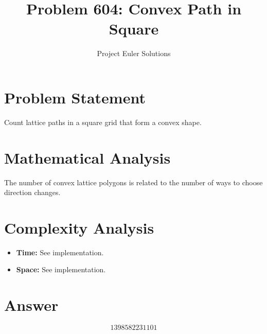 \documentclass[11pt]{article}
\title{Problem 604: Convex Path in Square}
\author{Project Euler Solutions}
\date{}
\begin{document}
\maketitle

\section{Problem Statement}
Count lattice paths in a square grid that form a convex shape.

\section{Mathematical Analysis}
The number of convex lattice polygons is related to the number of ways to choose direction changes.

\section{Complexity Analysis}
\begin{itemize}
    \item \textbf{Time:} See implementation.
    \item \textbf{Space:} See implementation.
\end{itemize}

\section{Answer}

\[
\boxed{1398582231101}
\]
\end{document}
